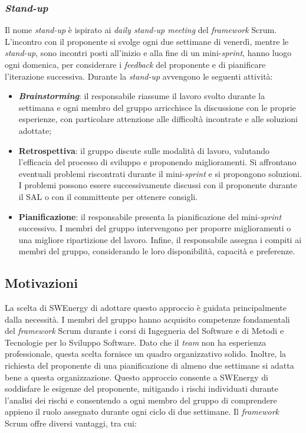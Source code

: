 \subsubsection{\textit{Stand-up}}
Il nome \textit{stand-up} è ispirato ai \textit{daily stand-up meeting} del
\textit{framework} Scrum. 
L'incontro con il proponente si svolge ogni due settimane di venerdì, 
mentre le \textit{stand-up}, sono incontri posti all'inizio e alla fine 
di un mini-\textit{sprint}, hanno luogo ogni domenica, per considerare 
i \textit{feedback} del proponente e di pianificare l'iterazione successiva.
Durante la \textit{stand-up} avvengono le seguenti attività:

\begin{itemize}
	\item \textbf{\textit{Brainstorming}}: il responsabile riassume il lavoro 
			svolto durante la settimana e ogni membro del gruppo arricchisce 
			la discussione con le proprie esperienze, con particolare attenzione 
			alle difficoltà incontrate e alle soluzioni adottate;

	\item \textbf{Retrospettiva}: il gruppo discute sulle modalità di lavoro, 
			valutando l'efficacia del processo di sviluppo e proponendo miglioramenti. 
			Si affrontano eventuali problemi riscontrati durante il mini-\textit{sprint} 
			e si propongono soluzioni. 
			I problemi possono essere successivamente discussi con il proponente 
			durante il SAL o con il committente per ottenere consigli.

	\item \textbf{Pianificazione}: il responsabile presenta la pianificazione del 
			mini-\textit{sprint} successivo. I membri del gruppo intervengono per proporre 
			miglioramenti o una migliore ripartizione del lavoro. 
			Infine, il responsabile assegna i compiti ai membri del gruppo, 
			considerando le loro disponibilità, capacità e preferenze.
\end{itemize}

\subsection{Motivazioni}
La scelta di SWEnergy di adottare questo approccio è guidata principalmente 
dalla necessità. 
I membri del gruppo hanno acquisito competenze fondamentali del 
\textit{framework} Scrum durante i corsi di Ingegneria del Software e di Metodi 
e Tecnologie per lo Sviluppo Software. 
Dato che il \textit{team} non ha esperienza professionale, questa scelta 
fornisce un quadro organizzativo solido. 
Inoltre, la richiesta del proponente di una pianificazione di almeno due settimane 
si adatta bene a questa organizzazione. 
Questo approccio consente a SWEnergy di soddisfare le esigenze del proponente, 
mitigando i rischi individuati durante l'analisi dei rischi e consentendo a 
ogni membro del gruppo di comprendere appieno il ruolo assegnato durante 
ogni ciclo di due settimane. 
Il \textit{framework} Scrum offre diversi vantaggi, tra cui:

